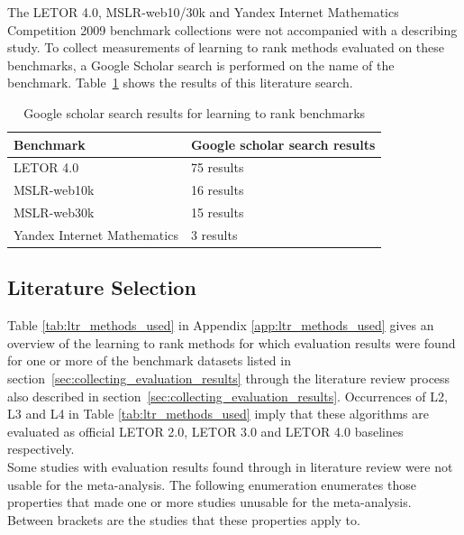 \documentclass{sig-alternate-2013}
\begin{document}
The LETOR 4.0, MSLR-web10/30k and Yandex Internet Mathematics Competition 2009 benchmark collections were not accompanied with a describing study. To collect measurements of learning to rank methods evaluated on these benchmarks, a Google Scholar search is performed on the name of the benchmark. Table~\ref{tbl:ltr_benchmark_searches} shows the results of this literature search.

\begin{table}[!h]
\begin{tabular}{p{5.2cm}p{2.5cm}}\toprule
Benchmark & Google scholar search results \\
\midrule
LETOR 4.0 & 75 results \\
MSLR-web10k & 16 results \\
MSLR-web30k & 15 results \\
Yandex Internet Mathematics & 3 results \\
\bottomrule
\end{tabular}
\caption{Google scholar search results for learning to rank benchmarks}
\label{tbl:ltr_benchmark_searches}
\end{table}

\subsection{Literature Selection}
Table \ref{tab:ltr_methods_used} in Appendix \ref{app:ltr_methods_used} gives an overview of the learning to rank methods for which evaluation results were found for one or more of the benchmark datasets listed in section~\ref{sec:collecting_evaluation_results} through the literature review process also described in section~\ref{sec:collecting_evaluation_results}. Occurrences of L2, L3 and L4 in Table \ref{tab:ltr_methods_used} imply that these algorithms are evaluated as official LETOR 2.0, LETOR 3.0 and LETOR 4.0 baselines respectively.\\

Some studies with evaluation results found through in literature review were not usable for the meta-analysis. The following enumeration enumerates those properties that made one or more studies unusable for the meta-analysis. Between brackets are the studies that these properties apply to.
\end{document}
